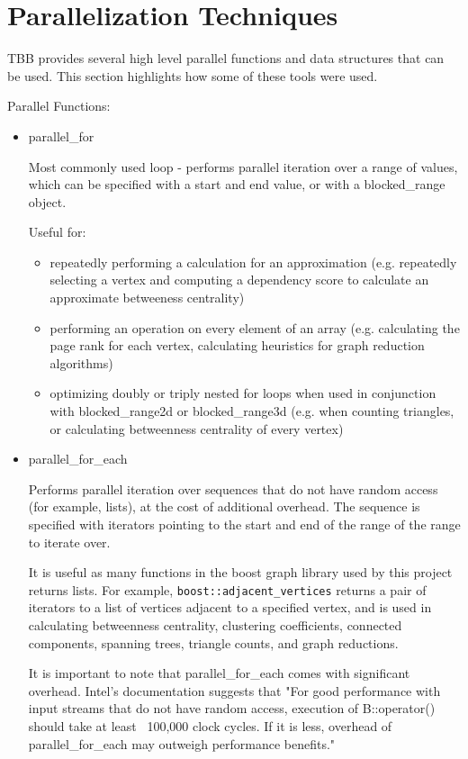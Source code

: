 \documentclass[12pt]{article}
\begin{document}
\section{Parallelization Techniques}

TBB provides several high level parallel functions and data structures that can be used. This section highlights how some of these tools were used.

Parallel Functions:
\begin{itemize}
  \item parallel\_for

  Most commonly used loop - performs parallel iteration over a range of values, which can be specified with a start and end value, or with a blocked\_range object.

  Useful for: 

  \begin{itemize}
    \item repeatedly performing a calculation for an approximation (e.g. repeatedly selecting a vertex and computing a dependency score to calculate an approximate betweeness centrality)
    \item performing an operation on every element of an array (e.g. calculating the page rank for each vertex, calculating heuristics for graph reduction algorithms)
    \item optimizing doubly or triply nested for loops when used in conjunction with blocked\_range2d or blocked\_range3d (e.g. when counting triangles, or calculating betweenness centrality of every vertex)
  \end{itemize}

  \item parallel\_for\_each

  Performs parallel iteration over sequences that do not have random access (for example, lists), at the cost of additional overhead. The sequence is specified with iterators pointing to the start and end of the range of the range to iterate over.

  It is useful as many functions in the boost graph library used by this project returns lists. For example, \texttt{boost::adjacent\_vertices} returns a pair of iterators to a list of vertices adjacent to a specified vertex, and is used in calculating betweenness centrality, clustering coefficients, connected components, spanning trees, triangle counts, and graph reductions.

  It is important to note that parallel\_for\_each comes with significant overhead. Intel's documentation suggests that "For good performance with input streams that do not have random access, execution of B::operator() should take at least ~100,000 clock cycles. If it is less, overhead of parallel\_for\_each may outweigh performance benefits."


\end{itemize}
\end{document}
